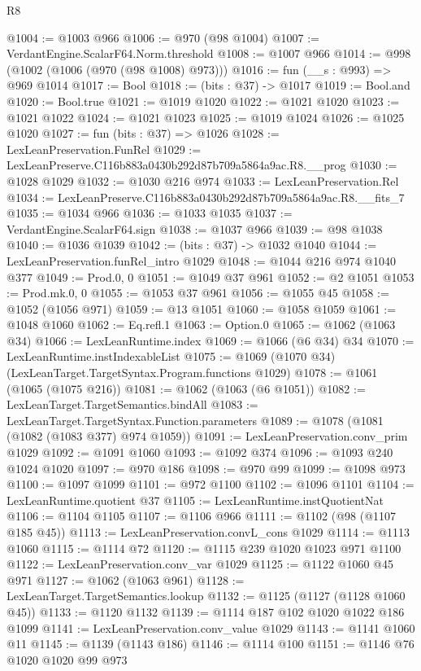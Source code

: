 \begin{lexlean}{R8}
\begin{coremodule}
@1004 := @1003 @966
@1006 := @970 (@98 @1004)
@1007 := VerdantEngine.ScalarF64.Norm.threshold
@1008 := @1007 @966
@1014 := @998 (@1002 (@1006 (@970 (@98 @1008) @973)))
@1016 := fun (__s : @993) => @969 @1014
@1017 := Bool
@1018 := (bits : @37) -> @1017
@1019 := Bool.and
@1020 := Bool.true
@1021 := @1019 @1020
@1022 := @1021 @1020
@1023 := @1021 @1022
@1024 := @1021 @1023
@1025 := @1019 @1024
@1026 := @1025 @1020
@1027 := fun (bits : @37) => @1026
@1028 := LexLeanPreservation.FunRel
@1029 := LexLeanPreserve.C116b883a0430b292d87b709a5864a9ac.R8.__prog
@1030 := @1028 @1029
@1032 := @1030 @216 @974
@1033 := LexLeanPreservation.Rel
@1034 := LexLeanPreserve.C116b883a0430b292d87b709a5864a9ac.R8.__fits_7
@1035 := @1034 @966
@1036 := @1033 @1035
@1037 := VerdantEngine.ScalarF64.sign
@1038 := @1037 @966
@1039 := @98 @1038
@1040 := @1036 @1039
@1042 := (bits : @37) -> @1032 @1040
@1044 := LexLeanPreservation.funRel_intro @1029
@1048 := @1044 @216 @974 @1040 @377
@1049 := Prod.{0, 0}
@1051 := @1049 @37 @961
@1052 := @2 @1051
@1053 := Prod.mk.{0, 0}
@1055 := @1053 @37 @961
@1056 := @1055 @45
@1058 := @1052 (@1056 @971)
@1059 := @13 @1051
@1060 := @1058 @1059
@1061 := @1048 @1060
@1062 := Eq.refl.{1}
@1063 := Option.{0}
@1065 := @1062 (@1063 @34)
@1066 := LexLeanRuntime.index
@1069 := @1066 (@6 @34) @34
@1070 := LexLeanRuntime.instIndexableList
@1075 := @1069 (@1070 @34) (LexLeanTarget.TargetSyntax.Program.functions @1029)
@1078 := @1061 (@1065 (@1075 @216))
@1081 := @1062 (@1063 (@6 @1051))
@1082 := LexLeanTarget.TargetSemantics.bindAll
@1083 := LexLeanTarget.TargetSyntax.Function.parameters
@1089 := @1078 (@1081 (@1082 (@1083 @377) @974 @1059))
@1091 := LexLeanPreservation.conv_prim @1029
@1092 := @1091 @1060
@1093 := @1092 @374
@1096 := @1093 @240 @1024 @1020
@1097 := @970 @186
@1098 := @970 @99
@1099 := @1098 @973
@1100 := @1097 @1099
@1101 := @972 @1100
@1102 := @1096 @1101
@1104 := LexLeanRuntime.quotient @37
@1105 := LexLeanRuntime.instQuotientNat
@1106 := @1104 @1105
@1107 := @1106 @966
@1111 := @1102 (@98 (@1107 @185 @45))
@1113 := LexLeanPreservation.convL_cons @1029
@1114 := @1113 @1060
@1115 := @1114 @72
@1120 := @1115 @239 @1020 @1023 @971 @1100
@1122 := LexLeanPreservation.conv_var @1029
@1125 := @1122 @1060 @45 @971
@1127 := @1062 (@1063 @961)
@1128 := LexLeanTarget.TargetSemantics.lookup
@1132 := @1125 (@1127 (@1128 @1060 @45))
@1133 := @1120 @1132
@1139 := @1114 @187 @102 @1020 @1022 @186 @1099
@1141 := LexLeanPreservation.conv_value @1029
@1143 := @1141 @1060 @11
@1145 := @1139 (@1143 @186)
@1146 := @1114 @100
@1151 := @1146 @76 @1020 @1020 @99 @973

\end{coremodule}
\end{lexlean}
